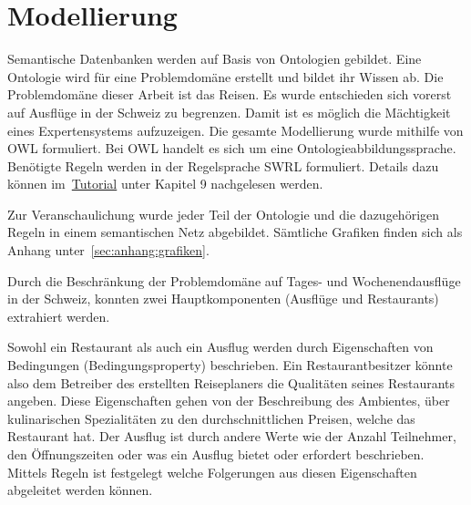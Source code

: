 \section{Modellierung}
\label{sec:loesung_modellierung}

Semantische Datenbanken werden auf Basis von Ontologien gebildet. Eine Ontologie wird für eine Problemdomäne erstellt und bildet ihr Wissen ab. Die Problemdomäne dieser Arbeit ist das Reisen. Es wurde entschieden sich vorerst auf Ausflüge in der Schweiz zu begrenzen. Damit ist es möglich die Mächtigkeit eines Expertensystems aufzuzeigen. Die gesamte Modellierung wurde mithilfe von OWL formuliert. Bei OWL handelt es sich um eine Ontologieabbildungssprache. Benötigte Regeln werden in der Regelsprache SWRL formuliert. Details dazu können im~\hyperref[sec:anhang:tutorial_dokument]{Tutorial} unter Kapitel 9 nachgelesen werden.

Zur Veranschaulichung wurde jeder Teil der Ontologie und die dazugehörigen Regeln in einem semantischen Netz abgebildet. Sämtliche Grafiken finden sich als Anhang unter~\ref{sec:anhang:grafiken}.



Durch die Beschränkung der Problemdomäne auf Tages- und Wochenendausflüge in der Schweiz, konnten zwei Hauptkomponenten (Ausflüge und Restaurants) extrahiert werden.

Sowohl ein Restaurant als auch ein Ausflug werden durch Eigenschaften von Bedingungen (Bedingungsproperty) beschrieben. Ein Restaurantbesitzer könnte also dem Betreiber des erstellten Reiseplaners die Qualitäten seines Restaurants angeben. Diese Eigenschaften gehen von der Beschreibung des Ambientes, über kulinarischen Spezialitäten zu den durchschnittlichen Preisen, welche das Restaurant hat. Der Ausflug ist durch andere Werte wie der Anzahl Teilnehmer, den Öffnungszeiten oder was ein Ausflug bietet oder erfordert beschrieben.
Mittels Regeln ist festgelegt welche Folgerungen aus diesen Eigenschaften abgeleitet werden können.

